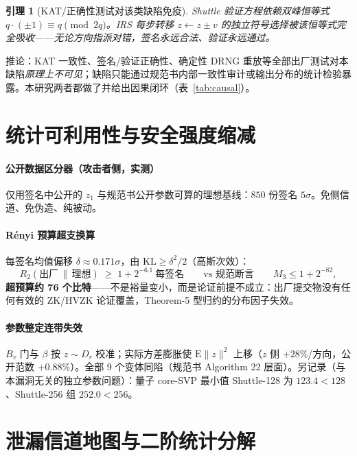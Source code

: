 \documentclass[11pt,a4paper]{ctexart}
\newtheorem{lemma}{引理}
\begin{document}
\begin{lemma}[KAT/正确性测试对该类缺陷免疫]\label{lem:immune}
Shuttle 验证方程依赖双峰恒等式 $q\cdot(\pm1)\equiv q \pmod{2q}$。IRS 每步转移 $z\leftarrow z\pm v$ 的\emph{独立符号选择}被该恒等式完全吸收——无论方向指派对错，签名永远合法、验证永远通过。
\end{lemma}

推论：KAT 一致性、签名/验证正确性、确定性 DRNG 重放等全部出厂测试对本缺陷\emph{原理上不可见}；缺陷只能通过规范书内部一致性审计或输出分布的统计检验暴露。本研究两者都做了并给出因果闭环（表~\ref{tab:causal}）。

\section{统计可利用性与安全强度缩减}\label{sec:exploit}

\paragraph{公开数据区分器（攻击者侧，实测）} 仅用签名中公开的 $z_1$ 与规范书公开参数可算的理想基线：$850$ 份签名 $5\sigma$。免侧信道、免伪造、纯被动。

\paragraph{Rényi 预算超支换算} 每签名均值偏移 $\delta\approx0.171\sigma$，由 $\mathrm{KL}\ge\delta^2/2$（高斯次效）：
\begin{equation}
R_2(\text{出厂}\,\|\,\text{理想})\;\ge\;1+2^{-6.1}\ \text{每签名}
\qquad\text{vs 规范断言}\qquad
M_3\le 1+2^{-82},
\end{equation}
\textbf{超预算约 76 个比特}——不是裕量变小，而是论证前提不成立：出厂提交物没有任何有效的 ZK/HVZK 论证覆盖，Theorem-5 型归约的分布因子失效。

\paragraph{参数整定连带失效} $B_v$ 门与 $\beta$ 按 $z\sim D_r$ 校准；实际方差膨胀使 $\mathrm{E}\|z\|^2$ 上移（$z$ 侧 $+28\%$/方向，公开范数 $+0.88\%$）。全部 9 个变体同陷（规范书 Algorithm 22 层面）。另记录（与本漏洞无关的独立参数问题）：量子 core-SVP 最小值 Shuttle-128 为 $123.4<128$、Shuttle-256 组 $252.0<256$。

\section{泄漏信道地图与二阶统计分解}\label{sec:channels}
\end{document}
